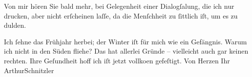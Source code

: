 \pstart
           Von mir hören Sie bald mehr, bei Gelegenheit einer {\pb}Dialogſa{\geminationm}lung, die ich nur drucken, aber nicht
               erſcheinen laſſe, da die Menſchheit zu{ }ſittlich iſt, um es zu dulden.\pend
           
\pstart
           Ich{ }ſehne das Frühjahr herbei; der Winter iſt für mich wie ein Gefängnis. Warum ich
               nicht in den Süden fliehe? Das hat allerlei Gründe – vielleicht auch gar keinen
               rechten. Ihre Geſundheit hoff ich iſt jetzt vollko{\geminationm}en
               gefeſtigt. Von Herzen Ihr \spacefill\mbox{ArthurSchnitzler}\pend
           \endnumbering{}  \newcommand{\dateiname}{L01012}\newcommand{\titel}{Arthur Schnitzler an Georg Brandes, 11. 2. 1900}\newcommand{\editorInnen}{Martin Anton Müller und Gerd-Hermann Susen}
